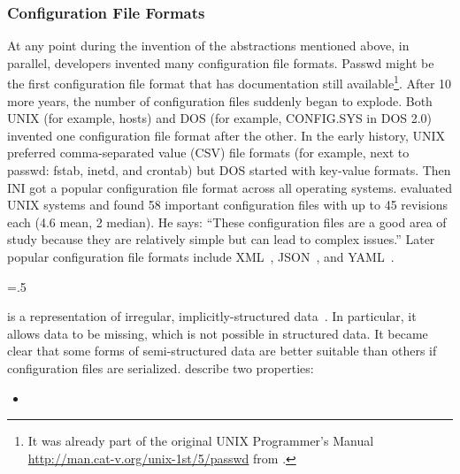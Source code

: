 \subsubsection{Configuration File Formats}
\label{sec:configuration-file-formats}

At any point during the invention of the abstractions mentioned above, in parallel, developers invented many configuration file formats.
Passwd might be the first configuration file format that has documentation still available\footnote{It was already part of the original UNIX Programmer's Manual \url{http://man.cat-v.org/unix-1st/5/passwd} from .}.
After 10 more years, the number of configuration files suddenly began to explode.
Both UNIX (for example, hosts) and DOS (for example, CONFIG.SYS in DOS 2.0) invented one configuration file format after the other.
In the early history, UNIX preferred comma-separated value (CSV) file formats (for example, next to passwd: fstab, inetd, and crontab) but DOS started with key-value formats.
Then INI got a  popular configuration file format across all operating systems.
\citet{evard1997analysis} evaluated UNIX systems and found 58 important configuration files with up to 45 revisions each (4.6 mean, 2 median).
He says: \enquote{These configuration files are a good area of study because they are relatively simple but can lead to complex issues.}
Later popular configuration file formats include XML~\cite{wadler2003xml}, JSON~\cite{crockford2006json}, and YAML~\cite{ben2005yaml}.%
{\parfillskip=0pt \emergencystretch=.5\textwidth \par}

is a representation of irregular, implicitly-structured data~\cite{abiteboul1997querying}.
In particular, it allows data to be missing, which is not possible in structured data.
It became clear that some forms of semi-structured data are better suitable than others if configuration files are serialized.
\citet{wadler2003xml} describe two properties:
\begin{itemize}

\item[]
\end{itemize}

